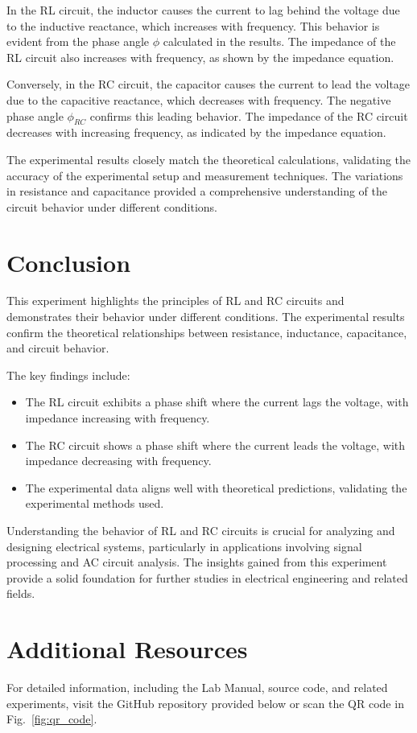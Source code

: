\documentclass[journal]{IEEEtran}
\begin{document}
In the RL circuit, the inductor causes the current to lag behind the voltage due to the inductive reactance, which increases with frequency. This behavior is evident from the phase angle \(\phi\) calculated in the results. The impedance of the RL circuit also increases with frequency, as shown by the impedance equation.

Conversely, in the RC circuit, the capacitor causes the current to lead the voltage due to the capacitive reactance, which decreases with frequency. The negative phase angle \(\phi_{RC}\) confirms this leading behavior. The impedance of the RC circuit decreases with increasing frequency, as indicated by the impedance equation.

The experimental results closely match the theoretical calculations, validating the accuracy of the experimental setup and measurement techniques. The variations in resistance and capacitance provided a comprehensive understanding of the circuit behavior under different conditions.

\section{Conclusion}
This experiment highlights the principles of RL and RC circuits and demonstrates their behavior under different conditions. The experimental results confirm the theoretical relationships between resistance, inductance, capacitance, and circuit behavior.

The key findings include:
\begin{itemize}
    \item The RL circuit exhibits a phase shift where the current lags the voltage, with impedance increasing with frequency.
    \item The RC circuit shows a phase shift where the current leads the voltage, with impedance decreasing with frequency.
    \item The experimental data aligns well with theoretical predictions, validating the experimental methods used.
\end{itemize}

Understanding the behavior of RL and RC circuits is crucial for analyzing and designing electrical systems, particularly in applications involving signal processing and AC circuit analysis. The insights gained from this experiment provide a solid foundation for further studies in electrical engineering and related fields.

\section{Additional Resources}
For detailed information, including the Lab Manual, source code, and related experiments, visit the GitHub repository provided below or scan the QR code in Fig.~\ref{fig:qr_code}.
\end{document}
